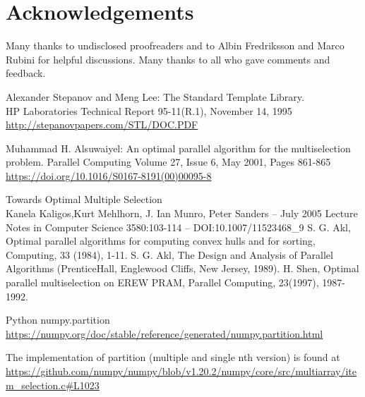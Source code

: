 \section*{Acknowledgements}

Many thanks to undisclosed proofreaders and to 
Albin Fredriksson and Marco Rubini for helpful discussions. Many thanks to all who gave comments and feedback.

\renewcommand{\bibname}{References}



\renewcommand{\addcontentsline}[3]{}%
\begin{thebibliography}{9}

Alexander Stepanov and Meng Lee: The Standard Template Library.\\HP Laboratories Technical Report 95-11(R.1), November 14, 1995 \\
\url{http://stepanovpapers.com/STL/DOC.PDF }

Muhammad H. Alsuwaiyel: An optimal parallel algorithm for the multiselection problem. 
Parallel Computing Volume 27, Issue 6, May 2001, Pages 861-865\\
\url{https://doi.org/10.1016/S0167-8191(00)00095-8 }

Towards Optimal Multiple Selection\\ 
Kanela Kaligos,Kurt Mehlhorn, J. Ian Munro, Peter Sanders --
July 2005 Lecture Notes in Computer Science 3580:103-114 --
DOI:10.1007/11523468_9
S. G. Akl, Optimal parallel algorithms for computing convex hulls and for sorting, Computing, 33 (1984), 1-11.
S. G. Akl, The Design and Analysis of Parallel Algorithms (PrenticeHall, Englewood Cliffs, New Jersey, 1989).
H. Shen, Optimal parallel multiselection on EREW PRAM, Parallel Computing, 23(1997), 1987-1992.

Python numpy.partition \\
\url{https://numpy.org/doc/stable/reference/generated/numpy.partition.html }

The implementation of partition (multiple and single nth version) is found at
{\footnotesize \url{https://github.com/numpy/numpy/blob/v1.20.2/numpy/core/src/multiarray/item_selection.c#L1023 }}


\end{thebibliography}
